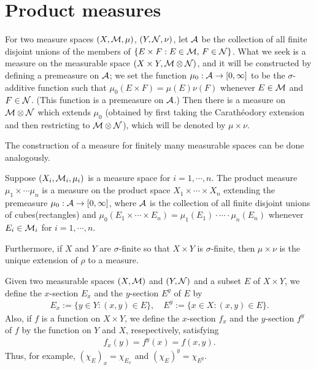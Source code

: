 \section{Product measures}

For two measure spaces $(X, {\mathcal{M}}, \mu)$, $(Y, {\mathcal{N}}, \nu)$, let ${\mathcal{A}}$ be the collection of all finite disjoint unions of the members of $\{E\times F:E\in{\mathcal{M}},\, F\in{\mathcal{N}}\}$.
What we seek is a measure on the measurable space $(X\times Y, {\mathcal{M}}\otimes{\mathcal{N}})$, and it will be constructed by defining a premeasure on ${\mathcal{A}}$; we set the function $\mu_0: {\mathcal{A}}\rightarrow [0, \infty]$ to be the $\sigma$-additive function such that $\mu_0(E\times F)=\mu(E)\nu(F)$ whenever $E\in{\mathcal{M}}$ and $F\in{\mathcal{N}}$. (This function is a premeasure on ${\mathcal{A}}$.)
Then there is a measure on ${\mathcal{M}}\otimes{\mathcal{N}}$ which extends $\mu_0$ (obtained by first taking the Carath\'eodory extension and then restricting to ${\mathcal{M}}\otimes{\mathcal{N}}$), which will be denoted by $\mu\times\nu$.

The construction of a measure for finitely many measurable spaces can be done analogously.
\begin{defi}
    Suppose $(X_i, {\mathcal{M}}_i, \mu_i)$ is a measure space for $i=1, \cdots, n$.
    The product measure $\mu_1\times\cdots\mu_n$ is a measure on the product space $X_1\times\cdots\times X_n$ extending the premeasure $\mu_0: {\mathcal{A}}\rightarrow [0, \infty]$, where ${\mathcal{A}}$ is the collection of all finite disjoint unions of cubes(rectangles) and $\mu_0(E_1\times\cdots\times E_n)=\mu_1(E_1)\cdot\cdots\cdot\mu_n(E_n)$ whenever $E_i\in{\mathcal{M}}_i$ for $i=1, \cdots, n$.
\end{defi}
Furthermore, if $X$ and $Y$ are $\sigma$-finite so that $X\times Y$ is $\sigma$-finite, then $\mu\times\nu$ is the unique extension of $\rho$ to a measure.

\begin{nota}
    Given two measurable spaces $(X, {\mathcal{M}})$ and $(Y, {\mathcal{N}})$ and a subset $E$ of $X\times Y$, we define the $x$-section $E_x$ and the $y$-section $E^y$ of $E$ by
    \begin{align*}
        E_x:=\{y\in Y: (x, y)\in E\},\quad E^y:=\{x\in X:(x, y)\in E\}.
    \end{align*}
    Also, if $f$ is a function on $X\times Y$, we define the $x$-section $f_x$ and the $y$-section $f^y$ of $f$ by the function on $Y$ and $X$, resepectively, satisfying
    \begin{align*}
        f_x(y)=f^y(x)=f(x, y).
    \end{align*}
    Thus, for example, $(\chi_E)_x=\chi_{E_x}$ and $(\chi_E)^y=\chi_{E^y}$.
\end{nota}

